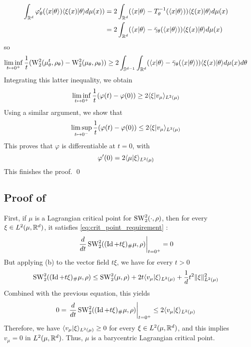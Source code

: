 \begin{align}
    \int_{\mathbb R^d} \varphi'_\theta(\langle x|\theta\rangle)\langle\xi(x)|\theta\rangle d\mu(x)) &= 2\int_{\mathbb R^d} (\langle x|\theta\rangle - T^{-1}_\theta(\langle x|\theta\rangle)) \langle\xi(x)|\theta\rangle d\mu(x) \\
    &= 2\int_{\mathbb R^d} (\langle x|\theta\rangle - \bar{\gamma}_\theta(\langle x|\theta\rangle)) \langle\xi(x)|\theta\rangle d\mu(x)
\end{align}
so
\begin{equation} \liminf_{t \mapsto 0^+} \frac{1}{t} (\mathrm{W}^2_2(\mu^t_\theta,\rho_\theta) - \mathrm{W}^2_2(\mu_\theta,\rho_\theta)) \geq 2\int_{\mathbb S^{d-1}} \int_{\mathbb R^d} (\langle x|\theta\rangle - \bar{\gamma}_\theta(\langle x|\theta\rangle)) \langle\xi(x)|\theta\rangle d\mu(x) d\theta \end{equation}
Integrating this latter inequality, we obtain 
\begin{equation} \liminf_{t \mapsto 0^+} \frac{1}{t} (\varphi(t) - \varphi(0)) \geq 2\langle\xi|v_\mu\rangle_{L^2(\mu)} \end{equation}
Using a similar argument, we show that
\begin{equation} \limsup_{t \mapsto 0^-} \frac{1}{t} (\varphi(t) - \varphi(0)) \leq 2\langle\xi|v_\mu\rangle_{L^2(\mu)} \end{equation}
This proves that $\varphi$ is differentiable at $t = 0$, with
\begin{equation} \varphi'(0) = 2\langle\mu|\xi\rangle_{L^2(\mu)}\end{equation}
This finishes the proof. \qed

\subsection{Proof of \texorpdfstring{}{}} \label{sec:proof_sw2_crit_point_char}

First, if $\mu$ is a Lagrangian critical point for $\mathop{\mathrm{SW}}\nolimits^2_2(\cdot,\rho)$, then for every $\xi \in L^2(\mu,\mathbb R^d)$, it satisfies \eqref{eq:crit_point_requirement} :
\begin{equation}
    \left.\frac{d}{dt}  \mathop{\mathrm{SW}}\nolimits_2^2((\mathop{\mathrm{Id}}\nolimits + t\xi)_{\#} \mu,\rho)\right|_{t=0^+} = 0
\end{equation}
But applying (b) to the vector field $t\xi$, we have for every $t > 0$
\begin{equation}
    \mathop{\mathrm{SW}}\nolimits_2^2((\mathop{\mathrm{Id}}\nolimits + t\xi)_{\#} \mu,\rho) \leq \mathop{\mathrm{SW}}\nolimits_2^2(\mu,\rho) + 2t\langle v_\mu|\xi\rangle_{L^2(\mu)} + \frac{1}{d}t^2\|\xi\|^2_{L^2(\mu)}
\end{equation}
Combined with the previous equation, this yields
\begin{equation}
    0 = \left.\frac{d}{dt}  \mathop{\mathrm{SW}}\nolimits_2^2((\mathop{\mathrm{Id}}\nolimits + t\xi)_{\#} \mu,\rho)\right|_{t=0^+} \leq 2\langle v_\mu|\xi\rangle_{L^2(\mu)} 
\end{equation}
Therefore, we have $\langle v_\mu|\xi\rangle_{L^2(\mu)} \geq 0$ for every $\xi \in L^2(\mu,\mathbb R^d)$, and this implies $v_\mu = 0$ in $L^2(\mu,\mathbb R^d)$. Thus, $\mu$ is a barycentric Lagrangian critical point. \newline

